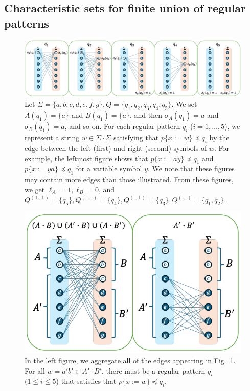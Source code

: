 \subsection{Characteristic sets for finite union of regular patterns}\label{subsec:char_union}

\begin{figure}[t]
  \begin{center}
    \includegraphics[scale=0.54]{figs/lem8eachreg.pdf}
    \caption{Let $\Sigma=\{a,b,c,d,e,f,g\}, Q=\{q_1,q_2,q_3,q_4,q_5\}$. We set $A(q_1)=\{a\}$ and $B(q_1)=\{a\}$, and then $\sigma_A(q_1)=a$ and $\sigma_B(q_1)=a$, and so on. For each regular pattern $q_i$ ($i=1,\ldots,5$), we represent a string $w \in \Sigma\cdot\Sigma$ satisfying that $p\{x:=w\}\preceq q_i$ by the edge between the left (first) and right (second) symbols of $w$. For example, the leftmost figure shows that $p\{x:=ay\}\preceq q_1$ and $p\{x:=ya\}\preceq q_1$ for a variable symbol $y$. We note that these figures may contain more edges than those illustrated. From these figures, we get $\ell_A=1, \ell_B=0$, and $Q^{(\bot,\bot)}=\{q_5\}, Q^{(\bot,\cdot)}=\{q_4\}, Q^{(\cdot,\bot)}=\{q_3\}, Q^{(\cdot,\cdot)}=\{q_1,q_2\}$.}\label{fig:lem8eachreg}
  \end{center}
\end{figure}

\begin{figure}[t]
  \begin{center}
    \includegraphics[scale=0.525]{figs/lem8totalreg.pdf}
    \caption{In the left figure, we aggregate all of the edges appearing in Fig.~\ref{fig:lem8eachreg}. For all $w=a'b'\in A'\cdot B'$, there must be a regular pattern $q_i$ $(1\leq i\leq 5$) that satisfies that $p \{ x:=w \} \preceq q_i$.}\label{fig:lem8totalreg}
  \end{center}
\end{figure}

